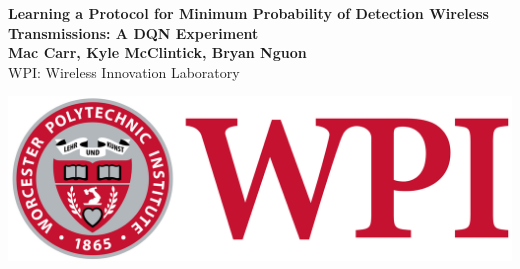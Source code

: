 \documentclass[a0,portrait]{a0poster}
\begin{document}


\vspace*{2cm}
\begin{minipage}[t]{0.7\linewidth}
\veryHuge \color{wpi_red} \textbf{Learning a Protocol for Minimum Probability of Detection Wireless Transmissions: A DQN Experiment}
\color{Black}\\[0.5cm] %
\huge \textbf{Mac Carr, Kyle McClintick, Bryan Nguon}\\[0.5cm] %
\huge WPI: Wireless Innovation Laboratory\\[0.4cm] %
\end{minipage}%
\hspace{1cm}
\begin{minipage}[t]{0.3\linewidth}
\strut\vspace*{-\baselineskip}\newline\includegraphics[width=22cm]{WPI_Inst_Prim_FulClr_cropped.png}\\

\end{minipage}
\end{document}
